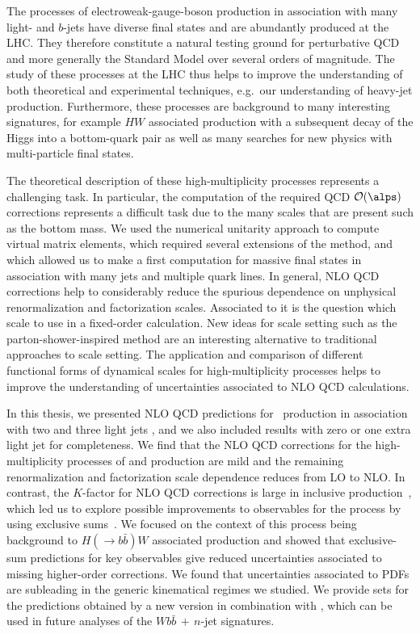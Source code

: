 The processes of electroweak-gauge-boson production in association
with many light- and $b$-jets have diverse final states and are abundantly produced at the LHC. They therefore constitute a
natural testing ground for perturbative QCD and more generally the Standard Model
over several orders of magnitude. The study of these processes at the
LHC thus helps to improve the understanding of both theoretical and experimental
techniques, e.g.\ our understanding of heavy-jet production. Furthermore, these processes are background to many interesting signatures, for example $HW$ associated production with a subsequent decay of the Higgs into a
bottom-quark pair as well as many searches for new physics with
multi-particle final states. 

The theoretical description of these
high-multiplicity processes represents a
challenging task. In particular, the computation of the required QCD
$\mathcal{O}(\alps)$ corrections represents a difficult task due to the
many scales that are present such as the bottom mass. We used the numerical unitarity approach \cite{Bern:1994zx,Bern:1995db,Ossola:2006us,Ellis:2007br,Giele:2008ve,Ellis:2008ir} to compute virtual matrix elements, which required several extensions of the method, and which allowed us to make a first computation for massive final states in association with many jets and multiple quark lines. In general, NLO QCD corrections help to considerably reduce the spurious dependence on unphysical renormalization and factorization scales. Associated to it is the question which scale to use in a fixed-order calculation. New ideas for scale setting such as the parton-shower-inspired \MINLO{} method \cite{MINLO} are an interesting alternative to traditional approaches to scale setting. The application and comparison of different functional forms of dynamical scales for high-multiplicity processes helps to improve the understanding of uncertainties associated to NLO QCD calculations. 


In this thesis, we presented NLO QCD predictions for \Wbb~production
in association with two and three light jets \cite{wbbpaper}, and we also included results with zero or
one extra light jet for completeness. We find that the NLO QCD
corrections for the high-multiplicity processes of \Wbbnj[2]{}
and \Wbbnj[3]{} production are mild and the remaining renormalization and factorization scale 
dependence reduces from LO to NLO. In contrast, the $K$-factor for NLO QCD corrections is large in inclusive
\Wbb{}
production~\cite{Ellis:1998fv,FebresCordero:2006sj,Cordero:2009kv},
which led us to explore possible
improvements to observables for the \Wbb{} process by using exclusive
sums~\cite{ESums}. We focused on the context of this process being background to $H(\rightarrow b\bar b)W$ associated production and showed that exclusive-sum predictions for key observables give reduced uncertainties
associated to missing higher-order corrections. We
found that uncertainties associated to PDFs are subleading in the generic kinematical regimes we studied. We provide \ntuple{}
sets for the predictions obtained by a new \BlackHat{} version in
combination with \SHERPA{} \cite{Sherpa}, which can be used in future analyses of the 
$Wb\bar b\,\!+\!\,n$-jet
signatures.



